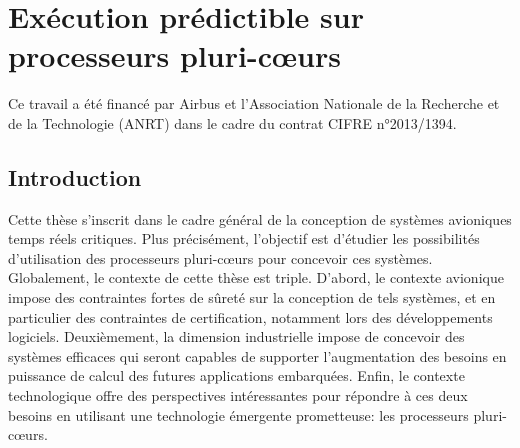 \documentclass[main.tex]{subfiles}
\begin{document}
\newtheorem{defFr}{Définition}
\newtheorem{regleem}{Règle}
\newtheorem{exemple}{Exemple}
\renewcommand{\tablename}{Tableau}
\renewcommand{\chaptername}{Chapitre}
\renewcommand{\thechapter}{\Alph{chapter}}
\setcounter{chapter}{0}
\chapter{Exécution prédictible sur processeurs pluri-c\oe{}urs}
\thispagestyle{chapstyle}
\label{chap_resumeFr}


Ce travail a été financé par Airbus et l'Association Nationale de la Recherche et de la Technologie (ANRT) dans le cadre du contrat CIFRE n°2013/1394.

\section{Introduction}
Cette thèse s'inscrit dans le cadre général de la conception de systèmes avioniques temps réels critiques. Plus précisément, l'objectif est d'étudier les possibilités d'utilisation des processeurs pluri-c\oe{}urs pour concevoir ces systèmes. Globalement, le contexte de cette thèse est triple. D'abord, le contexte avionique impose des contraintes fortes de sûreté sur la conception de tels systèmes, et en particulier des contraintes de certification, notamment lors des développements logiciels. Deuxièmement, la dimension industrielle impose de concevoir des systèmes efficaces qui seront capables de supporter l'augmentation des besoins en puissance de calcul des futures applications embarquées. Enfin, le contexte technologique offre des perspectives intéressantes pour répondre à ces deux besoins en utilisant une technologie émergente prometteuse: les processeurs pluri-c\oe{}urs.
\end{document}
